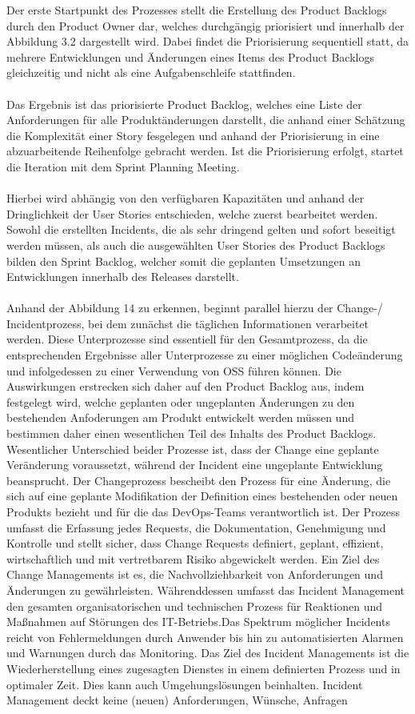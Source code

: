 Der erste Startpunkt des Prozesses stellt die Erstellung des Product Backlogs durch den Product Owner dar, welches durchgängig priorisiert und innerhalb der Abbildung 3.2 dargestellt wird. Dabei findet die Priorisierung sequentiell statt, da mehrere Entwicklungen und Änderungen eines Items des Product Backlogs gleichzeitig und nicht als eine Aufgabenschleife stattfinden.\\\\ Das Ergebnis ist das priorisierte Product Backlog, welches eine Liste der Anforderungen für alle Produktänderungen darstellt, die anhand einer Schätzung die Komplexität einer Story fesgelegen und anhand der Priorisierung in eine abzuarbeitende Reihenfolge gebracht werden. Ist die Priorisierung erfolgt, startet die Iteration mit dem Sprint Planning Meeting.\\\\ Hierbei wird abhängig von den verfügbaren Kapazitäten und anhand der Dringlichkeit der User Stories entschieden, welche zuerst bearbeitet werden. Sowohl die erstellten Incidents, die als sehr dringend gelten und sofort beseitigt werden müssen, als auch die ausgewählten User Stories des Product Backlogs bilden den Sprint Backlog, welcher somit die geplanten Umsetzungen an Entwicklungen innerhalb des Releases darstellt.\\\\ Anhand der Abbildung 14 zu erkennen, beginnt parallel hierzu der Change-/ Incidentprozess, bei dem zunächst die täglichen Informationen verarbeitet werden. Diese Unterprozesse sind essentiell für den Gesamtprozess, da die entsprechenden Ergebnisse aller Unterprozesse zu einer möglichen Codeänderung und infolgedessen zu einer Verwendung von OSS führen können. Die Auswirkungen erstrecken sich daher auf den Product Backlog aus, indem festgelegt wird, welche geplanten oder ungeplanten Änderungen zu den bestehenden Anfoderungen am Produkt entwickelt werden müssen und bestimmen daher einen wesentlichen Teil des Inhalts des Product Backlogs. Wesentlicher Unterschied beider Prozesse ist, dass der Change eine geplante Veränderung voraussetzt, während der Incident eine ungeplante Entwicklung beansprucht. Der Changeprozess bescheibt den Prozess für eine Änderung, die sich auf eine geplante Modifikation der Definition eines bestehenden oder neuen Produkts bezieht und für die das DevOps-Teams verantwortlich ist. Der Prozess umfasst die Erfassung jedes Requests, die Dokumentation, Genehmigung und Kontrolle und stellt sicher, dass Change Requests definiert, geplant, effizient, wirtschaftlich und mit vertretbarem Risiko abgewickelt werden. Ein Ziel des Change Managements ist es, die Nachvollziehbarkeit von Anforderungen und Änderungen zu gewährleisten. Währenddessen umfasst das Incident Management den gesamten organisatorischen und technischen Prozess für Reaktionen und Maßnahmen auf Störungen des IT-Betriebs.Das Spektrum möglicher Incidents reicht von Fehlermeldungen durch Anwender bis hin zu automatisierten Alarmen und Warnungen durch das Monitoring. Das Ziel des Incident Managements ist die Wiederherstellung eines zugesagten Dienstes in einem definierten Prozess und in optimaler Zeit. Dies kann auch Umgehungslösungen beinhalten. Incident Management deckt keine (neuen) Anforderungen, Wünsche, Anfragen 